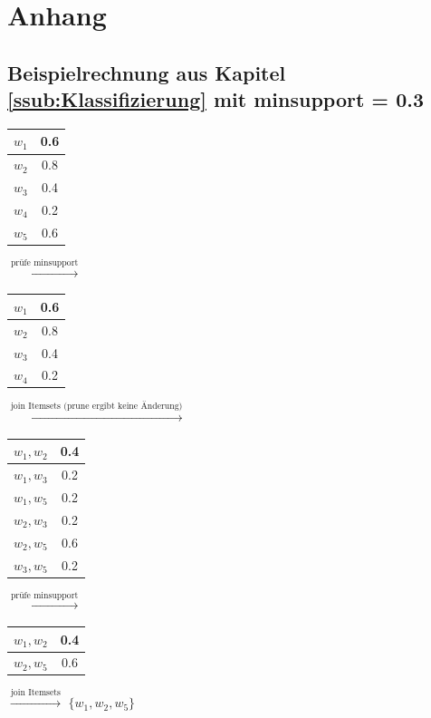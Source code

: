 \newpage
\appendix
\section{Anhang}

\subsection*{Beispielrechnung aus Kapitel \ref{ssub:Klassifizierung} mit minsupport = 0.3} \label{anhang:zusatz1}

\begin{minipage}[t]{\textwidth}
	\begin{tabular}{c|c}
		$w_1$&0.6\\ \hline
		$w_2$&0.8\\ \hline
		$w_3$&0.4\\ \hline
		$w_4$&0.2\\ \hline
		$w_5$&0.6\\ 
	\end{tabular}
	$\xrightarrow{\text{prüfe minsupport}}$
	\begin{tabular}{c|c}
		$w_1$&0.6\\ \hline
		$w_2$&0.8\\ \hline
		$w_3$&0.4\\ \hline
		$w_4$&0.2\\ 
	\end{tabular}
	$\xrightarrow{\text{join Itemsets (prune ergibt keine Änderung)}}$
	\begin{tabular}{c|c}
		$w_1,w_2$&0.4\\ \hline
		$w_1,w_3$&0.2\\ \hline
		$w_1,w_5$&0.2\\ \hline
		$w_2,w_3$&0.2\\ \hline
		$w_2,w_5$&0.6\\ \hline
		$w_3,w_5$&0.2\\
	\end{tabular}
\end{minipage}
\newline
\newline
\begin{minipage}[t]{\textwidth}
	$\xrightarrow{\text{prüfe minsupport}}$
	\begin{tabular}{c|c}
		$w_1,w_2$&0.4\\ \hline
		$w_2,w_5$&0.6\\ 
	\end{tabular}
	$\xrightarrow{\text{join Itemsets}}$
		$\{w_1,w_2,w_5\}$
\end{minipage}\\
